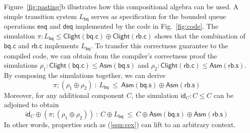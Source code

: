 \documentclass[acmsmall,screen,review,anonymous]{acmart}
\newcommand{\kw}[1]{\ensuremath{ \mathsf{#1} }}
\begin{document}

\begin{example} \label{ex:compcomp} %
Figure~\ref{fig:pasting}b
illustrates how this compositional algebra can be used.
A simple transition system $L_\kw{bq}$ serves as specification
for the bounded queue operations $\kw{enq}$ and $\kw{deq}$
implemented by the code in Fig.~\ref{fig:code}.
The simulation
$
  \pi : L_\kw{bq}
    \le \kw{Clight}(\kw{bq.c}) \oplus \kw{Clight}(\kw{rb.c})
$
shows that the combination of $\kw{bq.c}$ and $\kw{rb.c}$
implements $L_\kw{bq}$.
To transfer this correctness guarantee to the compiled code,
we can obtain from the compiler's correctness proof the simulations
$\rho_1 : \kw{Clight}(\kw{bq.c}) \le \kw{Asm}(\kw{bq.s})$ and
$\rho_2 : \kw{Clight}(\kw{rb.c}) \le \kw{Asm}(\kw{rb.s})$.
By composing the simulations together,
we can derive
\begin{equation}
  \pi \mathbin; (\rho_1 \oplus \rho_2) \::\:
  L_\kw{bq} \:\le\:
  \kw{Asm}(\kw{bq.s}) \oplus \kw{Asm}(\kw{rb.s})
  \label{eqn:cex}
\end{equation}
Moreover, for any additional component $C$,
the simulation $\kw{id}_C : C \le C$ can be adjoined
to obtain
\begin{equation}
  \kw{id}_C \oplus (\pi \mathbin; (\rho_1 \oplus \rho_2))
  \::\:
  C \oplus L_\kw{bq}
  \:\le\:
  C \oplus \kw{Asm}(\kw{bq.s}) \oplus \kw{Asm}(\kw{rb.s})
  \label{eqn:ccex}
\end{equation}
In other words,
properties such as (\ref{eqn:cex})
can lift to an arbitrary context.
\end{example}

\end{document}
